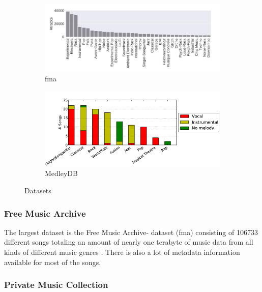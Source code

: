 \begin{figure}[htbp]
{{	\begin{subfigure}{0.5\textwidth}
		\centering
		\includegraphics[scale=0.35]{Images/fma_genre.JPG}
		\caption{fma \cite[p. 4]{fma1}}
		\label{fmadist}
	\end{subfigure}
	\begin{subfigure}{0.5\textwidth}
		\centering
		\includegraphics[scale=0.35]{Images/MedleyDB1.png}
		\caption{MedleyDB \cite[p. 2]{medleydb1}}
		\label{medleydbdist}
	\end{subfigure}
	}}
	\caption{Datasets}
	\label{fig:datasetdist}
\end{figure}
\FloatBarrier

\subsubsection{Free Music Archive}

The largest dataset is the Free Music Archive- dataset (fma) consisting of 106733 different songs totaling an amount of nearly one terabyte of music data from all kinds of different music genres \cite{fma1}. There is also a lot of metadata information available for most of the songs.

\subsubsection{Private Music Collection}

